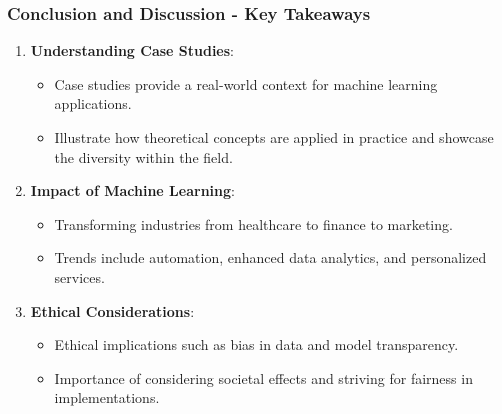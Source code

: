 \documentclass{beamer}
\begin{document}
\begin{frame}[fragile]
    \frametitle{Conclusion and Discussion - Key Takeaways}
    \begin{enumerate}
        \item \textbf{Understanding Case Studies}: 
        \begin{itemize}
            \item Case studies provide a real-world context for machine learning applications.
            \item Illustrate how theoretical concepts are applied in practice and showcase the diversity within the field.
        \end{itemize}
        
        \item \textbf{Impact of Machine Learning}:
        \begin{itemize}
            \item Transforming industries from healthcare to finance to marketing.
            \item Trends include automation, enhanced data analytics, and personalized services.
        \end{itemize}
        
        \item \textbf{Ethical Considerations}:
        \begin{itemize}
            \item Ethical implications such as bias in data and model transparency.
            \item Importance of considering societal effects and striving for fairness in implementations.
        \end{itemize}
    \end{enumerate}
\end{frame}
\end{document}
